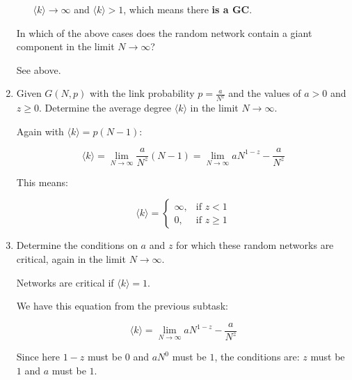 \begin{enumerate}
\begin{itemize}
			$\langle k \rangle \rightarrow \infty$ and $\langle k \rangle > 1$, which means there \textbf{is a GC}. 
	\end{itemize}

	In which of the above cases does the random network contain a giant component in the limit $N \rightarrow \infty$?
	
	See above.
	
	\item Given $G(N,p)$ with the link probability $p = \frac{a}{N^z}$ and the values of $a > 0$ and $z \geq 0$. Determine the average degree $\langle k \rangle$ in the limit $N \rightarrow \infty$.
	
	Again with $\langle k \rangle = p(N-1)$:
	
	\begin{equation}
		\langle k \rangle = \lim\limits_{N \rightarrow \infty} \frac{a}{N^z}(N-1) = \lim\limits_{N \rightarrow \infty} aN^{1-z} - \frac{a}{N^z}
	\end{equation}
	
	This means:
  
	\[
		\langle k \rangle = 
			\begin{cases}
	   			\infty, & \text{if } z < 1\\
	   			0, & \text{if }z \geq 1
			\end{cases}
	\]

	\item Determine the conditions on $a$ and $z$ for which these random networks are critical,  again in the limit $N \rightarrow \infty$.
	
	Networks are critical if $\langle k \rangle = 1$.
	
	We have this equation from the previous subtask: 
	
	\begin{equation}
		\langle k \rangle = \lim\limits_{N \rightarrow \infty} aN^{1-z} - \frac{a}{N^z}
	\end{equation}
	
	Since here $1-z$ must be $0$ and $aN^0$ must be $1$, the conditions are:  $z$ must be $1$ and $a$ must be $1$.
	
\end{enumerate}
